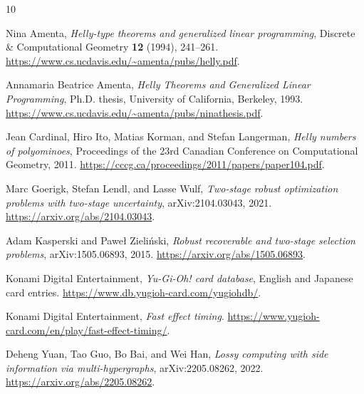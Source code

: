 \documentclass[11pt,a4paper]{amsart}
\theoremstyle{definition}
\theoremstyle{remark}
\begin{document}
\begin{thebibliography}{10}
\raggedright

Nina Amenta, \emph{Helly-type theorems and generalized linear programming},
Discrete \& Computational Geometry \textbf{12} (1994), 241--261.
\url{https://www.cs.ucdavis.edu/~amenta/pubs/helly.pdf}.

Annamaria Beatrice Amenta, \emph{Helly Theorems and Generalized Linear Programming},
Ph.D. thesis, University of California, Berkeley, 1993.
\url{https://www.cs.ucdavis.edu/~amenta/pubs/ninathesis.pdf}.

Jean Cardinal, Hiro Ito, Matias Korman, and Stefan Langerman,
\emph{Helly numbers of polyominoes}, Proceedings of the 23rd Canadian
Conference on Computational Geometry, 2011.
\url{https://cccg.ca/proceedings/2011/papers/paper104.pdf}.

Marc Goerigk, Stefan Lendl, and Lasse Wulf,
\emph{Two-stage robust optimization problems with two-stage uncertainty},
arXiv:2104.03043, 2021. \url{https://arxiv.org/abs/2104.03043}.

Adam Kasperski and Pawe{\l} Zieli{\'n}ski,
\emph{Robust recoverable and two-stage selection problems},
arXiv:1505.06893, 2015. \url{https://arxiv.org/abs/1505.06893}.

Konami Digital Entertainment, \emph{Yu-Gi-Oh! card database},
English and Japanese card entries.
\url{https://www.db.yugioh-card.com/yugiohdb/}.

Konami Digital Entertainment, \emph{Fast effect timing}.
\url{https://www.yugioh-card.com/en/play/fast-effect-timing/}.

Deheng Yuan, Tao Guo, Bo Bai, and Wei Han,
\emph{Lossy computing with side information via multi-hypergraphs},
arXiv:2205.08262, 2022. \url{https://arxiv.org/abs/2205.08262}.

\end{thebibliography}
\end{document}
